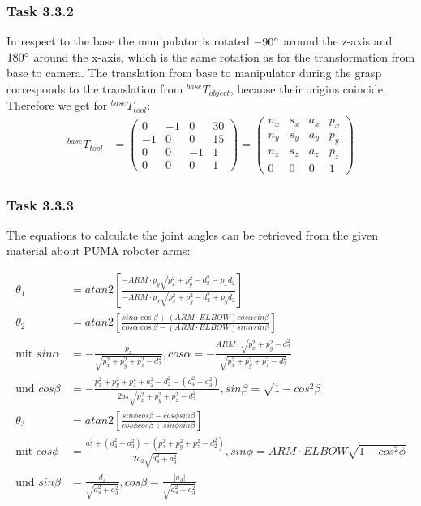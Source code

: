 \subsubsection*{Task 3.3.2}
In respect to the base the manipulator is rotated $-90\degree$ around the z-axis and $180\degree$ around the x-axis, which is the same rotation as for the transformation from base to camera.
The translation from base to manipulator during the grasp corresponds to the translation from $^{base}T_{object}$, because their origins coincide.
Therefore we get for $^{base}T_{tool}$:
\begin{align*}
^{base}T_{tool} &=
\begin{pmatrix}
0 & -1 & 0 & 30\\
-1 & 0 & 0 & 15\\
0 & 0 & -1 & 1\\
0 & 0 & 0 & 1
\end{pmatrix}
=
\begin{pmatrix}
n_x & s_x & a_x & p_x\\
n_y & s_y & a_y & p_y\\
n_z & s_z & a_z & p_z\\
0 & 0 & 0 & 1
\end{pmatrix}
\end{align*}

\subsubsection*{Task 3.3.3}
The equations to calculate the joint angles can be retrieved from the given material about PUMA roboter arms:

\begin{align*}
\theta_1 &=atan2\left[\frac{-ARM\cdot p_y\sqrt{p_x^2+p_y^2-d_2^2}-p_xd_2}{-ARM\cdot p_x\sqrt{p_x^2+p_y^2-d_2^2}+p_yd_2}\right]\\
\theta_2 &=atan2\left[\frac{sin\alpha\cos\beta+(ARM\cdot ELBOW)cos\alpha sin\beta}{cos\alpha\cos\beta-(ARM\cdot ELBOW)sin\alpha sin\beta}\right]\\
\text{mit } sin\alpha &= -\frac{p_z}{\sqrt{p_x^2+p_y^2+p_z^2-d_2^2}}, cos\alpha = -\frac{ARM\cdot \sqrt{p_x^2+p_y^2-d_2^2}}{\sqrt{p_x^2+p_y^2+p_z^2-d_2^2}}\\
\text{und } cos\beta &= -\frac{p_x^2+p_y^2+p_z^2+a_2^2-d_2^2-(d_4^2+a_3^2)}{2a_2\sqrt{p_x^2+p_y^2+p_z^2-d_2^2}}, sin\beta = \sqrt{1-cos^2\beta}\\
\theta_3 &=atan2\left[\frac{sin\phi cos\beta-cos\phi sin\beta}{cos\phi cos\beta+sin\phi sin\beta}\right]\\
\text{mit } cos\phi &= \frac{a_2^2+(d_4^2+a_3^2)-(p_x^2+p_y^2+p_z^2-d_2^2)}{2a_2\sqrt{d_4^2+a_3^2}}, sin\phi = ARM\cdot ELBOW\sqrt{1-cos^2\phi}\\
\text{und } sin\beta &= \frac{d_4}{\sqrt{d_4^2+a_3^2}}, cos\beta = \frac{|a_3|}{\sqrt{d_4^2+a_3^2}}
\end{align*}

